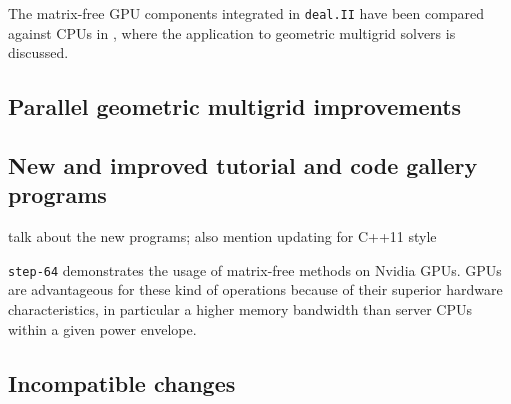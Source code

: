 \documentclass{ansarticle-preprint}
\newcommand{\specialword}[1]{\texttt{#1}}
\newcommand{\dealii}{{\specialword{deal.II}}\xspace}
\begin{document}
The matrix-free GPU components integrated in \dealii have been compared against
CPUs in \cite{KronbichlerLjungkvist2019}, where the application to geometric
multigrid solvers is discussed.

\subsection{Parallel geometric multigrid improvements}
\label{subsec:gmg}

\subsection{New and improved tutorial and code gallery programs}
\label{subsec:steps}

talk about the new programs; also mention updating for C++11 style


\texttt{step-64} demonstrates the usage of matrix-free methods on Nvidia GPUs.
GPUs are advantageous for these kind of operations because of their superior
hardware characteristics, in particular a higher memory bandwidth than server
CPUs within a given power envelope.

\subsection{Incompatible changes}
\end{document}
